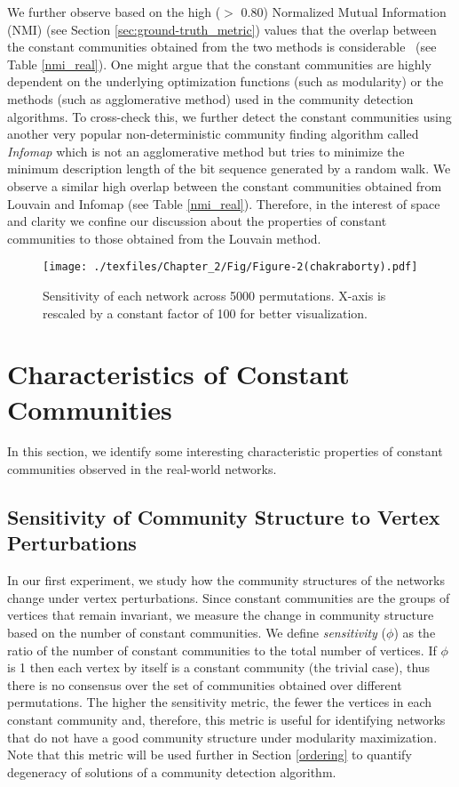 We further observe based on the high ($>$ 0.80) Normalized Mutual
Information (NMI)  \cite{nmi} (see Section \ref{sec:ground-truth_metric}) values that the overlap
between the constant communities obtained from the two methods is considerable~\cite{nmi_2} (see Table \ref{nmi_real}). One might
argue that the constant communities are highly dependent on the underlying optimization functions (such as modularity) or the methods (such
as agglomerative method) used in the community detection algorithms. To cross-check this, we further detect the constant communities using
another very popular non-deterministic community
finding
algorithm called {\em Infomap} \cite{info} which is not an agglomerative
method but tries to minimize the minimum description length of the bit
sequence generated by a random walk. We observe a similar high overlap between the constant communities obtained from Louvain and
Infomap (see Table \ref{nmi_real}). Therefore, in the interest of space and
clarity we confine our discussion about the properties of constant communities to those obtained from the Louvain method.


\begin{figure}[!t]
\centering
\texttt{[image: ./texfiles/Chapter\_2/Fig/Figure-2(chakraborty).pdf]}
\caption{ Sensitivity of each network across 5000 permutations. X-axis is rescaled by a constant factor of 100 for better
visualization. }\label{fig:sensitivity}
\end{figure}



\section{Characteristics of Constant Communities}
In this section, we identify some interesting characteristic properties of constant communities observed in the real-world networks.


\subsection{Sensitivity of Community Structure to Vertex Perturbations} \label{sensitive}
In our first experiment, we study how the community structures of
the
networks change under vertex perturbations. Since constant communities are the groups
of vertices that remain invariant, we measure the change in community structure based on the number of constant
communities. We define \textit{sensitivity} ($\phi$) as the ratio of the number of constant communities to the
total number of vertices. If $\phi$ is 1 then each vertex by itself is a constant community (the trivial case),
thus there is no consensus over the set of communities obtained over different permutations. The higher
the sensitivity metric, the fewer the vertices in each constant community and, therefore, this metric is useful
for identifying networks that do not have a good community structure under modularity maximization. Note that this metric will be used
further in Section \ref{ordering} to quantify degeneracy of solutions of a community detection algorithm. 

